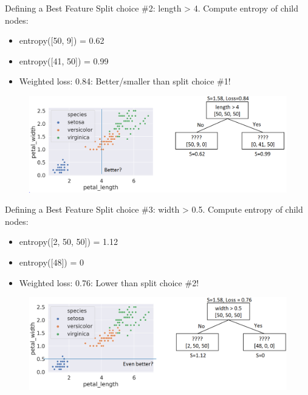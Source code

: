 \documentclass[aspectratio=169]{../latex_main/tntbeamer}  %
\begin{document}
	
	\begin{frame}{Defining a Best Feature}
	    Split choice \#2: length > 4. Compute entropy of child nodes:
	    \begin{itemize}
	        \item entropy([50, 9]) = 0.62
	        \item entropy([41, 50]) = 0.99
	        \item Weighted loss: 0.84: \alert{Better/smaller than split choice \#1!}
	    \end{itemize}
	    
	    \begin{figure}
	        \centering
	        \includegraphics[scale=.4]{figure_tree/Bild49}
	    \end{figure}
	\end{frame}
	
	
	\begin{frame}{Defining a Best Feature}
	    Split choice \#3: width > 0.5. Compute entropy of child nodes:
	    \begin{itemize}
	        \item entropy([2, 50, 50]) = 1.12
	        \item entropy([48]) = 0
	        \item Weighted loss: 0.76: \alert{Lower than split choice \#2!}

	    \end{itemize}
	    
	    \begin{figure}
	        \centering
	        \includegraphics[scale=.4]{figure_tree/Bild50}
	    \end{figure}
	\end{frame}
	
\end{document}
